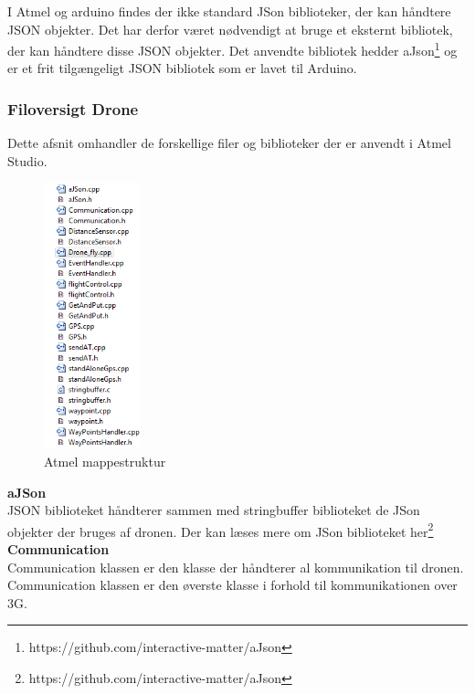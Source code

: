 I Atmel og arduino findes der ikke standard JSon biblioteker, der kan håndtere JSON objekter. Det har derfor været nødvendigt at bruge et eksternt bibliotek, der kan håndtere disse JSON objekter.
Det anvendte bibliotek hedder aJson\footnote{https://github.com/interactive-matter/aJson} og er et frit tilgængeligt JSON bibliotek som er lavet til Arduino.


\newpage

\subsubsection*{Filoversigt Drone}

Dette afsnit omhandler de forskellige filer og biblioteker der er anvendt i Atmel Studio. 


\begin{figure}[H]
	\centering
	\includegraphics[width=0.25\textwidth]{Billeder/implementation/Howtoguide/atmel_filer.png}
	\caption{Atmel mappestruktur}
	\label{fig:drone_mappestruktur}
\end{figure}

\textbf{aJSon}\\
JSON biblioteket håndterer sammen med stringbuffer biblioteket de JSon objekter der bruges af dronen. Der kan læses mere om JSon biblioteket her\footnote{https://github.com/interactive-matter/aJson} \\ 

\textbf{Communication}\\
Communication klassen er den klasse der håndterer al kommunikation til dronen. Communication klassen er den øverste klasse i forhold til kommunikationen over 3G. \\ 

